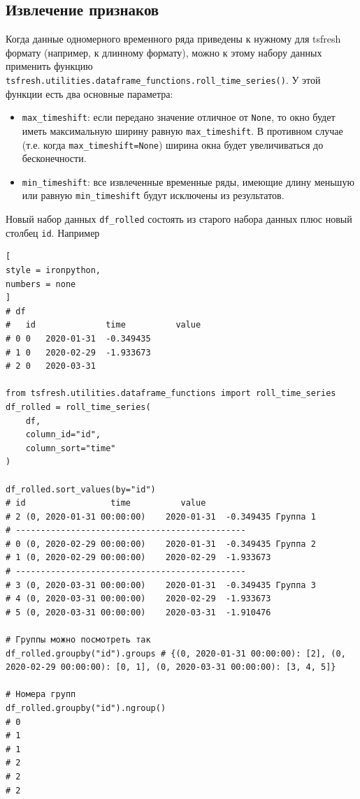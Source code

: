 \documentclass[%
	11pt,
	a4paper,
	utf8,
		]{article}
\begin{document}
\subsection{Извлечение признаков}

Когда данные одномерного временного ряда приведены к нужному для tsfresh формату (например, к длинному формату), можно к этому набору данных применить функцию \texttt{tsfresh.utilities.dataframe\_functions.roll\_time\_series()}. У этой функции есть два основные параметра:
\begin{itemize}
	\item \texttt{max\_timeshift}: если передано значение отличное от \texttt{None}, то окно будет иметь максимальную ширину равную \texttt{max\_timeshift}. В противном случае (т.е. когда \texttt{max\_timeshift=None}) ширина окна будет увеличиваться до бесконечности.
	
	\item \texttt{min\_timeshift}: все извлеченные временные ряды, имеющие длину меньшую или равную \texttt{min\_timeshift} будут исключены из результатов.
\end{itemize}

Новый набор данных \texttt{df\_rolled} состоять из старого набора данных плюс новый столбец \texttt{id}. Например
\begin{lstlisting}[
style = ironpython,
numbers = none	
]
# df
#	id	            time	      value
# 0	0	2020-01-31	-0.349435
# 1	0	2020-02-29	-1.933673
# 2	0	2020-03-31	

from tsfresh.utilities.dataframe_functions import roll_time_series
df_rolled = roll_time_series(
	df,
	column_id="id",
	column_sort="time"
)

df_rolled.sort_values(by="id")
# id	             time	       value
# 2	(0, 2020-01-31 00:00:00)	2020-01-31	-0.349435 Группа 1
# ----------------------------------------------
# 0	(0, 2020-02-29 00:00:00)	2020-01-31	-0.349435 Группа 2
# 1	(0, 2020-02-29 00:00:00)	2020-02-29	-1.933673
# ----------------------------------------------
# 3	(0, 2020-03-31 00:00:00)	2020-01-31	-0.349435 Группа 3
# 4	(0, 2020-03-31 00:00:00)	2020-02-29	-1.933673
# 5	(0, 2020-03-31 00:00:00)	2020-03-31	-1.910476

# Группы можно посмотреть так
df_rolled.groupby("id").groups # {(0, 2020-01-31 00:00:00): [2], (0, 2020-02-29 00:00:00): [0, 1], (0, 2020-03-31 00:00:00): [3, 4, 5]}

# Номера групп 
df_rolled.groupby("id").ngroup()
# 0
# 1
# 1
# 2
# 2
# 2
\end{lstlisting}
\end{document}
